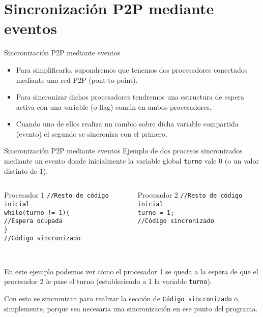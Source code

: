 \documentclass{beamer}
\begin{document}
\section{Sincronización P2P mediante eventos}
\begin{frame}{Sincronización P2P mediante eventos}
	\begin{itemize}
		\item Para simplificarlo, supondremos que tenemos dos procesadores conectados mediante una red P2P (pont-to-point).
		
		\item Para sincronizar dichos procesadores tendremos una estructura de espera activa con una variable (o flag) común en ambos procesadores.
		
		\item Cuando uno de ellos realiza un cambio sobre dicha variable compartida (evento) el segundo se sincroniza con el primero.
	\end{itemize}
\end{frame}

\begin{frame}{Sincronización P2P mediante eventos}
Ejemplo de dos procesos sincronizados mediante un evento donde inicialmente la variable global \texttt{turno} vale 0 (o un valor distinto de 1).
	\begin{columns}
		\begin{block}{Procesador 1}
			\texttt{//Resto de código inicial\\
			while(turno != 1)\{\\
			\hspace{0.8cm}//Espera ocupada\\
			\}\\
			//Código sincronizado}
		\end{block}
		\begin{block}{Procesador 2}
			\texttt{//Resto de código inicial\\
			turno = 1;\\
			//Código sincronizado}
		\end{block}
	\end{columns}
\textcolor{white}{a\\}
En este ejemplo podemos ver cómo el procesador 1 se queda a la espera de que el procesador 2 le pase el turno (estableciendo a 1 la variable \texttt{turno}).

Con esto se sincronizan para realizar la sección de \texttt{Código sincronizado} o, simplemente, porque sea necesaria una sincronización en ese punto del programa.
\end{frame}
\end{document}
